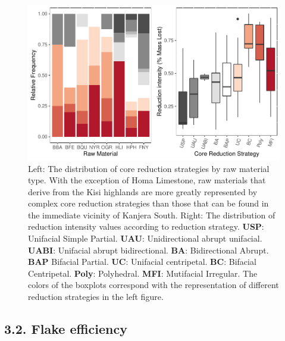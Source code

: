 \documentclass[]{elsarticle} %
\makeatletter
\def\maxwidth{\ifdim\Gin@nat@width>\linewidth\linewidth
\else\Gin@nat@width\fi}
\let\Oldincludegraphics\includegraphics
\renewcommand{\includegraphics}[1]{\Oldincludegraphics[width=\maxwidth]{#1}}
\makeatother
\begin{document}
\begin{figure}
\centering
\includegraphics{HUMEV-D-20-00115_revised_draft_files/figure-latex/fig-5-1.pdf}
\caption{Left: The distribution of core reduction strategies by raw
material type. With the exception of Homa Limestone, raw materials that
derive from the Kisi highlands are more greatly represented by complex
core reduction strategies than those that can be found in the immediate
vicinity of Kanjera South. Right: The distribution of reduction
intensity values according to reduction strategy. \textbf{USP}:
Unifacial Simple Partial. \textbf{UAU}: Unidirectional abrupt unifacial.
\textbf{UABI}: Unifacial abrupt bidirectional. \textbf{BA}:
Bidirectional Abrupt. \textbf{BAP} Bifacial Partial. \textbf{UC}:
Unifacial centripetal. \textbf{BC}: Bifacial Centripetal. \textbf{Poly}:
Polyhedral. \textbf{MFI}: Mutifacial Irregular. The colors of the
boxplots correspond with the representation of different reduction
strategies in the left figure. \label{core.tech}}
\end{figure}

\hypertarget{flake-efficiency}{%
\subsection{3.2. Flake efficiency}\label{flake-efficiency}}
\end{document}
